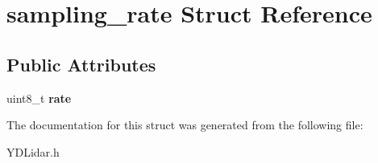 \hypertarget{structsampling__rate}{}\section{sampling\+\_\+rate Struct Reference}
\label{structsampling__rate}
\subsection*{Public Attributes}
\begin{DoxyCompactItemize}
\item 
uint8\+\_\+t {\bfseries rate}\hypertarget{structsampling__rate_a8d860fbedd930d2022fe7bb6cf1f78b6}{}\label{structsampling__rate_a8d860fbedd930d2022fe7bb6cf1f78b6}

\end{DoxyCompactItemize}


The documentation for this struct was generated from the following file\+:\begin{DoxyCompactItemize}
\item 
Y\+D\+Lidar.\+h\end{DoxyCompactItemize}
